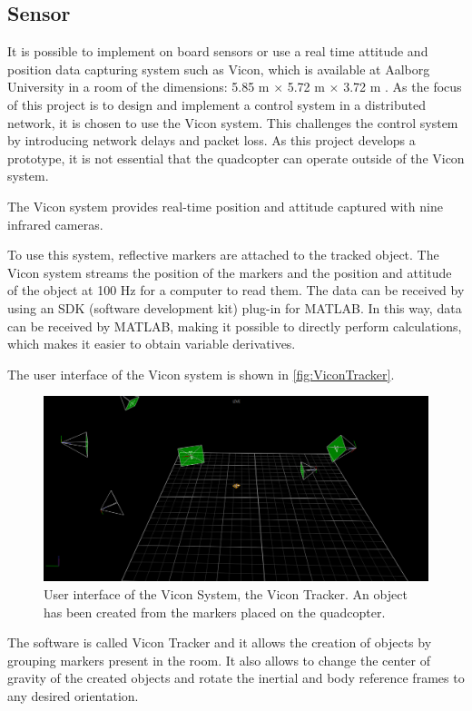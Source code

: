 \subsection{Sensor}
It is possible to implement on board sensors or use a real time attitude and position data capturing system such as Vicon, which is available at Aalborg University in a room of the dimensions: 5.85 m $\times$ 5.72 m $\times$ 3.72 m .
As the focus of this project is to design and implement a control system in a distributed network, it is chosen to use the Vicon system. This challenges the control system by introducing network delays and packet loss. As this project develops a prototype, it is not essential that the quadcopter can operate outside of the Vicon system.

The Vicon system provides real-time position and attitude captured with nine infrared cameras.
%

To use this system, reflective markers are attached to the tracked object. The Vicon system streams the position of the markers and the position and attitude of the object at 100 Hz for a computer to read them\cite{ViconDataSTream}. The data can be received by using an SDK (software development kit) plug-in for MATLAB. In this way, data can be received by MATLAB, making it possible to directly perform calculations, which makes it easier to obtain variable derivatives.

The user interface of the Vicon system is shown in \autoref{fig:ViconTracker}. 
\begin{figure}[H]
	\centering
	\includegraphics[scale=0.27]{figures/ViconTracker}
	\caption{User interface of the Vicon System, the Vicon Tracker. An object has been created from the markers placed on the quadcopter.}
	\label{fig:ViconTracker}
\end{figure}
%
The software is called Vicon Tracker and it allows the creation of objects by grouping markers present in the room. It also allows to change the center of gravity of the created objects and rotate the inertial and body reference frames to any desired orientation.

